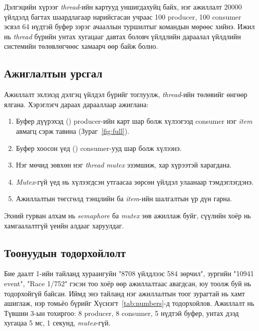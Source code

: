 \documentclass[12pt,a4paper]{article}
\newcommand{\term}[1]{\textit{#1}} %
\begin{document}
Дэлгэцийн хүрээг \term{thread}-ийн картууд уншигдахуйц байх, нэг ажиллалт 20000 үйлдэлд багтах шаардлагаар нарийсгасан учраас 100 producer, 100 consumer эсвэл 64 нүдтэй буфер зэрэг ачааллын туршилтыг командын мөрөөс хийнэ. Ижил  нь \term{thread} бүрийн унтах хугацааг давтах боловч үйлдлийн дараалал үйлдлийн системийн төлөвлөгчөөс хамаарч өөр байж болно.

\subsection{Ажиглалтын урсгал}
Ажиллалт эхлэхэд дэлгэц үйлдэл бүрийг тоглуулж, \term{thread}-ийн төлөвийг өнгөөр ялгана. Хэрэглэгч дараах дарааллаар ажиглана:
\begin{enumerate}
  \item Буфер дүүрэхэд () producer-ийн карт шар болж хүлээгээд consumer нэг \term{item} авмагц сэрж тавина (Зураг~\ref{fig:full}).
  \item Буфер хоосон үед () consumer-ууд шар болж хүлээнэ.
  \item Нэг мөчид зөвхөн нэг \term{thread} \term{mutex} эзэмшиж, хар хүрээтэй харагдана.
  \item \term{Mutex}-гүй үед  нь хүлээгдсэн утгаасаа зөрсөн үйлдэл улаанаар тэмдэглэгдэнэ.
  \item Ажиллалтын төгсгөлд тэнцлийн ба \term{item}-ийн шалгалтын үр дүн гарна.
\end{enumerate}
Эхний гурван алхам нь \term{semaphore} ба \term{mutex} зөв ажиллаж буйг, сүүлийн хоёр нь хамгаалалтгүй үеийн алдааг харуулдаг.

\subsection{Тоонуудын тодорхойлолт}
Бие даалт 1-ийн тайланд хураангуйн "8708 үйлдлээс 584 зөрчил", зургийн "10941 event", "Race 1/752" гэсэн тоо хоёр өөр ажиллалтаас авагдсан, юу тоолж буй нь тодорхойгүй байсан. Иймд энэ тайланд нэг ажиллалтын тоог зурагтай нь хамт ашиглаж, нэр томьёо бүрийг Хүснэгт~\ref{tab:numbers}-д тодорхойлов. Ажиллалт нь Түвшин 3-ын тохиргоо: 8 producer, 8 consumer, 5 нүдтэй буфер, унтах дээд хугацаа 5 мс, 1 секунд, \term{mutex}-гүй.
\end{document}
